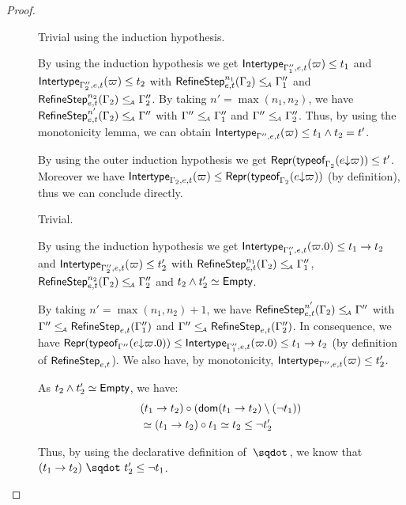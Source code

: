 \documentclass[a4paper]{article}
\theoremstyle{definition}
\begin{document}
\begin{proof}
\begin{description}
    \begin{description}
      \item[] Trivial using the induction hypothesis.
      \item[] By using the induction hypothesis we get
      $\env {\Gamma_1'',e,t} (\varpi) \leq t_1$ and $\env {\Gamma_2'',e,t} (\varpi) \leq t_2$
      with $\RefineStep {e,t}^{n_1} (\Gamma_2) \leqA \Gamma_1''$ and
      $\RefineStep {e,t}^{n_2} (\Gamma_2) \leqA \Gamma_2''$. By taking $n'=\max (n_1,n_2)$,
      we have $\RefineStep {e,t}^{n'} (\Gamma_2) \leqA \Gamma''$ with $\Gamma'' \leqA \Gamma_1''$ and $\Gamma'' \leqA \Gamma_2''$.
      Thus, by using the monotonicity lemma, we can obtain $\env {\Gamma'',e,t} (\varpi) \leq t_1 \land t_2 = t'$.
      \item[] By using the outer induction hypothesis we get
      $\tsrep{\tyof {\occ e \varpi} {\Gamma_2}} \leq t'$.
      Moreover we have $\env {\Gamma_2,e,t} (\varpi) \leq \tsrep{\tyof {\occ e \varpi} {\Gamma_2}}$
      (by definition), thus we can conclude directly.
      \item[] Trivial.
       
      \item[] By using the induction hypothesis we get
      $\env {\Gamma_1'',e,t} (\varpi.0) \leq \arrow {t_1} {t_2}$ and $\env {\Gamma_2'',e,t} (\varpi) \leq t_2'$
      with $\RefineStep {e,t}^{n_1} (\Gamma_2) \leqA \Gamma_1''$, $\RefineStep {e,t}^{n_2} (\Gamma_2) \leqA \Gamma_2''$
      and $t_2\land t_2' \simeq \Empty$.
      
      By taking $n'=\max (n_1,n_2) + 1$,
      we have $\RefineStep {e,t}^{n'} (\Gamma_2) \leqA \Gamma''$ with $\Gamma'' \leqA \RefineStep {e,t} (\Gamma_1'')$
      and $\Gamma'' \leqA \RefineStep {e,t} (\Gamma_2'')$.
      In consequence, we have $\tsrep{\tyof {\occ e {\varpi.0}} {\Gamma''}} \leq \env {\Gamma_1'',e,t} (\varpi.0) \leq \arrow {t_1} {t_2}$
      (by definition of $\RefineStep {e,t}$).
      We also have, by monotonicity, $\env {\Gamma'',e,t} (\varpi) \leq t_2'$.

      As $t_2\land t_2' \simeq \Empty$, we have:
      \begin{align*}
        &\apply {(\arrow {t_1} {t_2})} {(\dom{\arrow {t_1} {t_2}}\setminus(\neg t_1))}\\
        &\simeq \apply {(\arrow {t_1} {t_2})} {t_1} \simeq t_2 \leq \neg t_2'
      \end{align*}

      Thus, by using the declarative definition of $\worra {} {}$, we know that
      $\worra {(\arrow {t_1} {t_2})} {t_2'} \leq \neg t_1$.


\end{description}
\end{description}
\end{proof}
\end{document}
